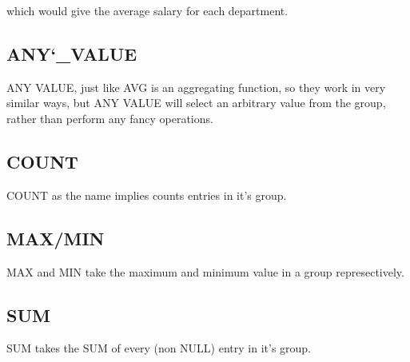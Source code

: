 \documentclass[10pt, english]{article}
\begin{document}
which would give the average salary for each department.

\subsection{ANY\char`_VALUE}
ANY VALUE, just like AVG is an aggregating function, so they work in very similar ways, but ANY VALUE will select an arbitrary value from the group, rather than 
perform any fancy operations.

\subsection{COUNT}
COUNT as the name implies counts entries in it's group.

\subsection{MAX/MIN}
MAX and MIN take the maximum and minimum value in a group represectively.

\subsection{SUM}
SUM takes the SUM of every (non NULL) entry in it's group.
\end{document}
